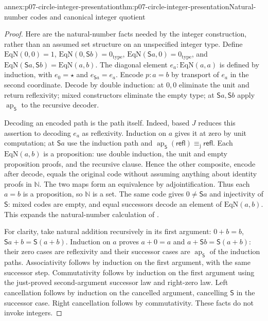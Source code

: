 \begin{annexitem}{annex:p07-circle-integer-presentation}{thm:p07-circle-integer-presentation}{Natural-number codes and canonical integer quotient}
\begin{proof}
Here are the natural-number facts needed by the integer construction, rather
than an assumed set structure on an unspecified integer type. Define
\(\mathrm{EqN}(0,0)=1\),
\(\mathrm{EqN}(0,\mathsf Sb)=0_{\mathrm{type}}\),
\(\mathrm{EqN}(\mathsf Sa,0)=0_{\mathrm{type}}\), and
\(\mathrm{EqN}(\mathsf Sa,\mathsf Sb)=\mathrm{EqN}(a,b)\).
The diagonal element \(e_a:\mathrm{EqN}(a,a)\) is defined by induction,
with \(e_0=\star\) and \(e_{\mathsf Sa}=e_a\).
Encode \(p:a=b\) by transport of \(e_a\) in the second coordinate.
Decode by double induction: at \(0,0\) eliminate the unit and return
reflexivity; mixed constructors eliminate the empty type; at
\(\mathsf Sa,\mathsf Sb\) apply \(\operatorname{ap}_{\mathsf S}\) to the
recursive decoder.

Decoding an encoded path is the path itself. Indeed, based \(J\) reduces
this assertion to decoding \(e_a\) as reflexivity. Induction on \(a\)
gives it at zero by unit computation; at \(\mathsf Sa\) use the induction
path and \(\operatorname{ap}_{\mathsf S}(\mathsf{refl})
\equiv_{\mathrm j}\mathsf{refl}\).
Each \(\mathrm{EqN}(a,b)\) is a proposition: use double induction, the unit
and empty proposition proofs, and the recursive clause. Hence the other
composite, encode after decode, equals the original code without assuming
anything about identity proofs in \(\mathbb N\). The two maps form an
equivalence by adjointification. Thus each \(a=b\) is a proposition,
so \(\mathbb N\) is a set. The same code gives \(0\ne\mathsf Sa\)
and injectivity of \(\mathsf S\): mixed codes are empty, and equal
successors decode an element of \(\mathrm{EqN}(a,b)\).
This expands the natural-number calculation of
\cite[\S2.13]{HoTT2013PublicReleaseFoundations}.

For clarity, take natural addition recursively in its first argument:
\(0+b=b\), \(\mathsf Sa+b=\mathsf S(a+b)\).
Induction on \(a\) proves \(a+0=a\) and
\(a+\mathsf Sb=\mathsf S(a+b)\): their zero cases are reflexivity
and their successor cases are \(\operatorname{ap}_{\mathsf S}\) of the
induction paths. Associativity follows by induction on the first argument,
with the same successor step. Commutativity follows by induction on the
first argument using the just-proved second-argument successor law and
right-zero law. Left cancellation follows by induction on the cancelled
argument, cancelling \(\mathsf S\) in the successor case. Right
cancellation follows by commutativity. These facts do not invoke integers.


\end{proof}
\end{annexitem}
